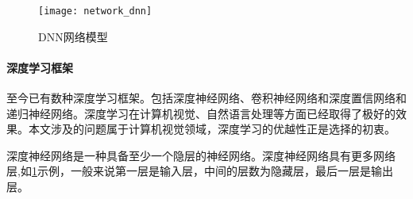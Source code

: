 \begin{figure}[!h]
	\centering
	\texttt{[image: network\_dnn]}
	\caption[]{\label{fig:network_dnn}
	DNN网络模型
	}
\end{figure}

\paragraph{深度学习框架}\cite{ wiki:Deep_learning}至今已有数种深度学习框架。包括深度神经网络、卷积神经网络和深度置信网络和递归神经网络。深度学习在计算机视觉、自然语言处理等方面已经取得了极好的效果。本文涉及的问题属于计算机视觉领域，深度学习的优越性正是选择的初衷。

深度神经网络是一种具备至少一个隐层的神经网络。深度神经网络具有更多网络层,如\cref{fig:network_dnn}示例，一般来说第一层是输入层，中间的层数为隐藏层，最后一层是输出层。

